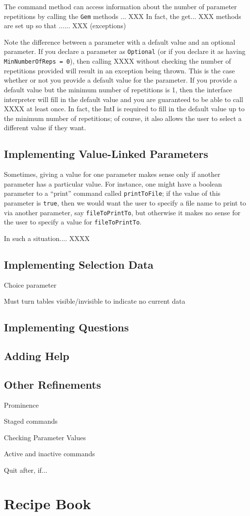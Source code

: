 \documentclass[11pt]{report}
\begin{document}
The command method can access information about the number of
parameter repetitions by calling the {\tt Gem} methods ...  XXX
In fact, the get... XXX  methods are set up so that ......  XXX
(exceptions)

Note the difference between a parameter with a default value
and an optional parameter.  If you declare a parameter as
{\tt Optional} (or if you declare it as having
{\tt MinNumberOfReps = 0}), then calling XXXX without checking
the number of repetitions provided will result in an exception
being thrown.  This is the case whether or not you provide a
default value for the parameter.  If you provide a default
value but the minimum number of repetitions is 1, then the
interface interpreter will fill in the default value and you
are guaranteed to be able to call XXXX at least once.  In fact,
the IntI is required to fill in the default value up to the
minimum number of repetitions; of course, it also allows the
user to select a different value if they want.

\subsection{Implementing Value-Linked Parameters}

Sometimes, giving a value for one parameter makes sense only
if another parameter has a particular value.  For instance,
one might have a boolean parameter to a ``print'' command called
{\tt printToFile}; if the value of this parameter is {\tt true},
then we would want the user to specify a file name to print to
via another parameter, say {\tt fileToPrintTo}, but otherwise
it makes no sense for the user to specify a value for
{\tt fileToPrintTo}.

In such a situation.... XXXX

\subsection{Implementing Selection Data}

Choice parameter

Must turn tables visible/invisible to indicate no current data

\subsection{Implementing Questions}

\subsection{Adding Help}

\subsection{Other Refinements}

Prominence

Staged commands

Checking Parameter Values

Active and inactive commands

Quit after, if...

\section{Recipe Book}
\end{document}
